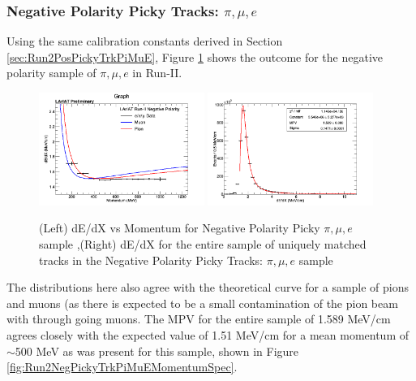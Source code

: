 \subsubsection{Negative Polarity Picky Tracks: $\pi, \mu, e$}\label{sec:Run2NegPickyTrkPiMuE}

Using the same calibration constants derived in Section \ref{sec:Run2PosPickyTrkPiMuE}, Figure \ref{fig:Run2NegPickyTrkPiMuEResults} shows the outcome for the negative polarity sample of $\pi, \mu, e$ in Run-II.

\begin{figure}[htb]
\centering
\includegraphics[width=0.48\textwidth]{images/dEdXvsMomentumNegPolRun2FineBin.png}
\includegraphics[width=0.48\textwidth]{images/dEdXNegPolRun2.png}
\caption{(Left) dE/dX vs Momentum for Negative Polarity Picky $\pi, \mu, e$ sample ,(Right) dE/dX for the entire sample of uniquely matched tracks in the Negative Polarity Picky Tracks: $\pi, \mu, e$ sample }
\label{fig:Run2NegPickyTrkPiMuEResults}
\end{figure}

The distributions here also agree with the theoretical curve for a sample of pions and muons (as there is expected to be a small contamination of the pion beam with through going muons. The MPV for the entire sample of 1.589 MeV/cm agrees closely with the expected value of 1.51 MeV/cm for a mean momentum of $\sim$500 MeV as was present for this sample, shown in Figure \ref{fig:Run2NegPickyTrkPiMuEMomentumSpec}.

